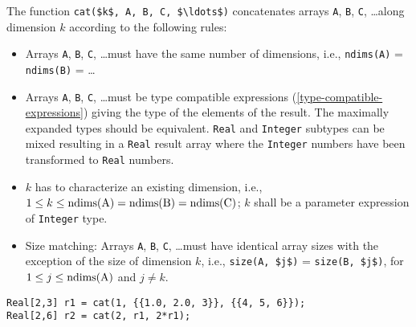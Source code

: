 The function \lstinline!cat($k$, A, B, C, $\ldots$)! concatenates arrays \lstinline!A!, \lstinline!B!, \lstinline!C!, \ldots along dimension $k$ according to the following rules:
\begin{itemize}
\item
  Arrays \lstinline!A!, \lstinline!B!, \lstinline!C!, \ldots must have the same number of dimensions, i.e., \lstinline!ndims(A)! = \lstinline!ndims(B)! = \ldots
\item
  Arrays \lstinline!A!, \lstinline!B!, \lstinline!C!, \ldots must be type compatible expressions (\cref{type-compatible-expressions}) giving the type of the elements of the result.
The maximally expanded types should be equivalent.
  \lstinline!Real! and \lstinline!Integer! subtypes can be mixed resulting in a \lstinline!Real! result array where the \lstinline!Integer! numbers have been transformed to \lstinline!Real! numbers.
\item
  $k$ has to characterize an existing dimension, i.e., $1 \leq k \leq \text{\lstinline!ndims(A)!} = \text{\lstinline!ndims(B)!} = \text{\lstinline!ndims(C)!}$; $k$ shall be a parameter expression of \lstinline!Integer! type.
\item
  Size matching: Arrays \lstinline!A!, \lstinline!B!, \lstinline!C!, \ldots must have identical array sizes with the exception of the size of dimension $k$, i.e., \lstinline!size(A, $j$)! = \lstinline!size(B, $j$)!, for $1 \leq j \leq \text{\lstinline!ndims(A)!}$ and $j \neq k$.
\end{itemize}

\begin{example}
\begin{lstlisting}[language=modelica]
Real[2,3] r1 = cat(1, {{1.0, 2.0, 3}}, {{4, 5, 6}});
Real[2,6] r2 = cat(2, r1, 2*r1);
\end{lstlisting}
\end{example}

